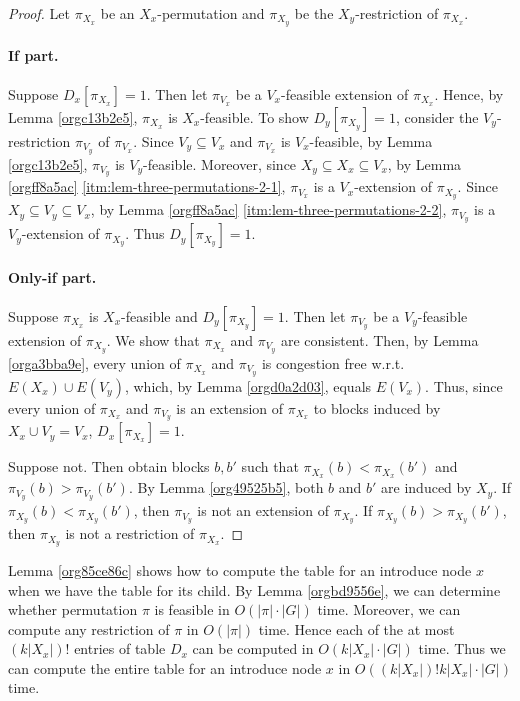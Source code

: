 \documentclass[fontsize=11pt,paper=a4]{book}
\begin{document}
\begin{proof}
Let \(\pi_{X_x}\) be an \(X_x\)-permutation and \(\pi_{X_y}\) be the \(X_y\)-restriction of \(\pi_{X_x}\).

\paragraph{If part.}
Suppose \(D_x[\pi_{X_x}]=1\).
Then let \(\pi_{V_x}\) be a \(V_x\)-feasible extension of \(\pi_{X_x}\).
Hence, by Lemma \ref{orgc13b2e5}, \(\pi_{X_x}\) is \(X_x\)-feasible.
To show \(D_y[\pi_{X_y}]=1\), consider the \(V_y\)-restriction \(\pi_{V_y}\) of \(\pi_{V_x}\).
Since \(V_y\subseteq V_x\) and \(\pi_{V_x}\) is \(V_x\)-feasible, by Lemma \ref{orgc13b2e5}, \(\pi_{V_y}\) is \(V_y\)-feasible.
Moreover, since \(X_y\subseteq X_x\subseteq V_x\), by Lemma \ref{orgff8a5ac} \ref{itm:lem-three-permutations-2-1}, \(\pi_{V_x}\) is a \(V_x\)-extension of \(\pi_{X_y}\).
Since \(X_y\subseteq V_y\subseteq V_x\), by Lemma \ref{orgff8a5ac} \ref{itm:lem-three-permutations-2-2}, \(\pi_{V_y}\) is a \(V_y\)-extension of \(\pi_{X_y}\).
Thus \(D_y[\pi_{X_y}]=1\).

\paragraph{Only-if part.}
Suppose \(\pi_{X_x}\) is \(X_x\)-feasible and \(D_y[\pi_{X_y}]=1\).
Then let \(\pi_{V_y}\) be a \(V_y\)-feasible extension of \(\pi_{X_y}\).
We show that \(\pi_{X_x}\) and \(\pi_{V_y}\) are consistent.
Then, by Lemma \ref{orga3bba9e}, every union of \(\pi_{X_x}\) and \(\pi_{V_y}\) is congestion free w.r.t. \(E(X_x)\cup E(V_y)\), which, by Lemma \ref{orgd0a2d03}, equals \(E(V_x)\).
Thus, since every union of \(\pi_{X_x}\) and \(\pi_{V_y}\) is an extension of \(\pi_{X_x}\) to blocks induced by \(X_x\cup V_y=V_x\), \(D_x[\pi_{X_x}]=1\).

Suppose not.
Then obtain blocks \(b,b'\) such that \(\pi_{X_x}(b)<\pi_{X_x}(b')\) and \(\pi_{V_y}(b)>\pi_{V_y}(b')\).
By Lemma \ref{org49525b5}, both \(b\) and \(b'\) are induced by \(X_y\).
If \(\pi_{X_y}(b)<\pi_{X_y}(b')\), then \(\pi_{V_y}\) is not an extension of \(\pi_{X_y}\).
If \(\pi_{X_y}(b)>\pi_{X_y}(b')\), then \(\pi_{X_y}\) is not a restriction of \(\pi_{X_x}\).
\end{proof}

Lemma \ref{org85ce86c} shows how to compute the table for an introduce node \(x\) when we have the table for its child.
By Lemma \ref{orgbd9556e}, we can determine whether permutation \(\pi\) is feasible in \(O(\lvert\pi\rvert\cdot\lvert G\rvert)\) time.
Moreover, we can compute any restriction of \(\pi\) in \(O(\lvert\pi\rvert)\) time.
Hence each of the at most \((k\lvert X_x\rvert)!\) entries of table \(D_x\) can be computed in \(O(k\lvert X_x\rvert\cdot\lvert G\rvert)\) time.
Thus we can compute the entire table for an introduce node \(x\) in \(O((k\lvert X_x\rvert)!k\lvert X_x\rvert\cdot\lvert G\rvert)\) time.
\end{document}
